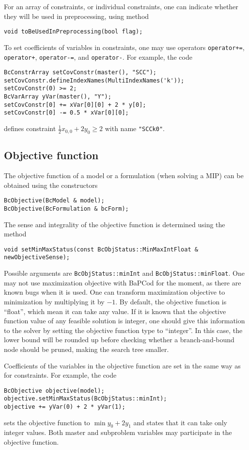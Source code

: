 \documentclass[10pt,a4paper]{article}
\newcommand{\bc}{BaPCod\xspace}
\begin{document}
For an array of constraints, or individual constraints, one can indicate whether they will be used in preprocessing,
using method
\begin{lstlisting}
void toBeUsedInPreprocessing(bool flag);
\end{lstlisting}

To set coefficients of variables in constraints, one may use operators \verb_operator+=_, \verb_operator+_,
\verb_operator-=_, and \verb_operator-_. For example, the code
\begin{lstlisting}
BcConstrArray setCovConstr(master(), "SCC");
setCovConstr.defineIndexNames(MultiIndexNames('k'));
setCovConstr(0) >= 2; 
BcVarArray yVar(master(), "Y");
setCovConstr[0] += xVar[0][0] + 2 * y[0]; 
setCovConstr[0] -= 0.5 * xVar[0][0]; 
\end{lstlisting}
defines constraint $\frac{1}{2}x_{0,0} + 2y_0 \geq 2$ with name \verb+"SCCk0"+.

\subsection{Objective function}
\label{sec:objective}

The objective function of a model or a formulation (when solving a MIP) can be obtained using the constructors
\begin{lstlisting}
BcObjective(BcModel & model);
BcObjective(BcFormulation & bcForm);
\end{lstlisting}

The sense and integrality of the objective function is determined using the method
\begin{lstlisting}
void setMinMaxStatus(const BcObjStatus::MinMaxIntFloat & newObjectiveSense);
\end{lstlisting}
Possible arguments are \verb+BcObjStatus::minInt+ and \verb+BcObjStatus::minFloat+. One may not use maximization
objective with \bc for the moment, as there are known bugs when it is used. One can transform maximization objective to
minimization by multiplying it by $-1$. By default, the objective function is ``float'', which mean it can take any
value. If it is known that the objective function value of any feasible solution is integer, one should give this
information to the solver by setting the objective function type to ``integer''. In this case, the lower bound will be
rounded up before checking whether a branch-and-bound node should be pruned, making the search tree smaller.

Coefficients of the variables in the objective function are set in the same way as for constraints. For example, the
code
\begin{lstlisting}
BcObjective objective(model);
objective.setMinMaxStatus(BcObjStatus::minInt);
objective += yVar(0) + 2 * yVar(1);
\end{lstlisting}
sets the objective function to $\min y_0 + 2y_1$ and states that it can take only integer values. Both master and
subproblem variables may participate in the objective function. 
\end{document}
